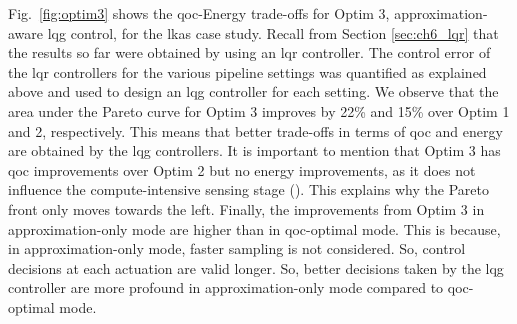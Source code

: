 \par Fig.\ \ref{fig:optim3} shows the \gls{qoc}-Energy trade-offs for Optim 3, approximation-aware \gls{lqg} control, for the \gls{lkas} case study. Recall from Section \ref{sec:ch6_lqr} that the results so far were obtained by using an \gls{lqr} controller. The control error of the \gls{lqr} controllers for the various pipeline settings was quantified as explained above and used to design an \gls{lqg} controller for each setting. We observe that the area under the Pareto curve for Optim 3 improves by 22\% and 15\% over Optim 1 and 2, respectively. This means that better trade-offs in terms of \gls{qoc} and energy are obtained by the \gls{lqg} controllers. It is important to mention that Optim 3 has \gls{qoc} improvements over Optim 2 but no energy improvements, as it does not influence the compute-intensive sensing stage (\taskS). This explains why the Pareto front only moves towards the left. Finally, the improvements from Optim 3 in approximation-only mode are higher than in \gls{qoc}-optimal mode. This is because, in approximation-only mode, faster sampling is not considered. So, control decisions at each actuation are valid longer. So, better decisions taken by the \gls{lqg} controller are more profound in approximation-only mode compared to \gls{qoc}-optimal mode.